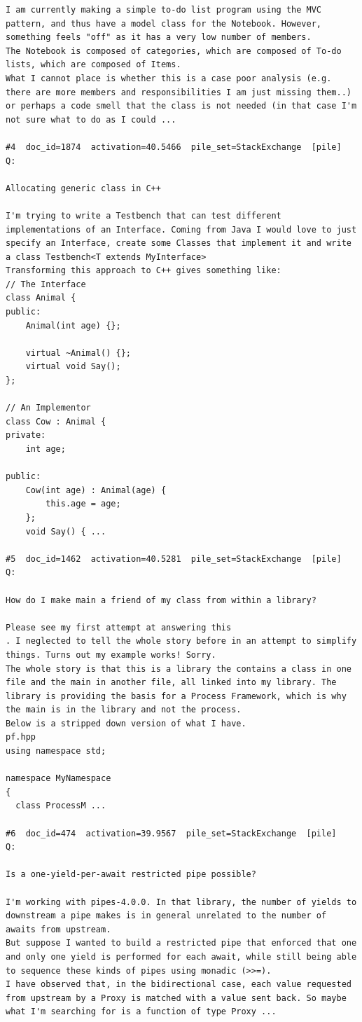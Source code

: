 \begin{verbatim}
I am currently making a simple to-do list program using the MVC pattern, and thus have a model class for the Notebook. However, something feels "off" as it has a very low number of members.
The Notebook is composed of categories, which are composed of To-do lists, which are composed of Items. 
What I cannot place is whether this is a case poor analysis (e.g. there are more members and responsibilities I am just missing them..) or perhaps a code smell that the class is not needed (in that case I'm not sure what to do as I could ...

#4  doc_id=1874  activation=40.5466  pile_set=StackExchange  [pile]
Q:

Allocating generic class in C++

I'm trying to write a Testbench that can test different implementations of an Interface. Coming from Java I would love to just specify an Interface, create some Classes that implement it and write a class Testbench<T extends MyInterface>
Transforming this approach to C++ gives something like:
// The Interface
class Animal {
public:
    Animal(int age) {};

    virtual ~Animal() {};
    virtual void Say();
};

// An Implementor
class Cow : Animal {
private:
    int age;

public:
    Cow(int age) : Animal(age) {
        this.age = age;
    };
    void Say() { ...

#5  doc_id=1462  activation=40.5281  pile_set=StackExchange  [pile]
Q:

How do I make main a friend of my class from within a library?

Please see my first attempt at answering this
. I neglected to tell the whole story before in an attempt to simplify things. Turns out my example works! Sorry.
The whole story is that this is a library the contains a class in one file and the main in another file, all linked into my library. The library is providing the basis for a Process Framework, which is why the main is in the library and not the process.
Below is a stripped down version of what I have.
pf.hpp
using namespace std;

namespace MyNamespace
{
  class ProcessM ...

#6  doc_id=474  activation=39.9567  pile_set=StackExchange  [pile]
Q:

Is a one-yield-per-await restricted pipe possible?

I'm working with pipes-4.0.0. In that library, the number of yields to downstream a pipe makes is in general unrelated to the number of awaits from upstream.
But suppose I wanted to build a restricted pipe that enforced that one and only one yield is performed for each await, while still being able to sequence these kinds of pipes using monadic (>>=).
I have observed that, in the bidirectional case, each value requested from upstream by a Proxy is matched with a value sent back. So maybe what I'm searching for is a function of type Proxy ...


\end{verbatim}

